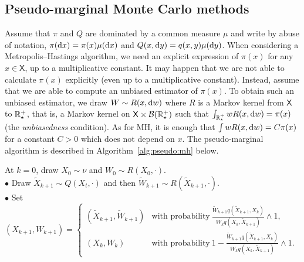 \documentclass[english,graybox,envcountchap,envcountsame,sectrefs,shortlabels]{svmono}
\theoremstyle{style}
\newcommand{\eqsp}{}
\newcommand{\Xset}{\mathsf{X}}
\begin{document}
\subsection{Pseudo-marginal Monte Carlo methods}
Assume that $\pi$ and $Q$ are dominated by a common measure $\mu$ and write by abuse of notation, $\pi(\mathrm{d} x)=\pi(x)\mu(\mathrm{d} x)$ and $Q(x,\mathrm{d} y)=q(x,y)\mu(\mathrm{d} y)$. When considering a Metropolis--Hastings algorithm, we need an explicit expression of $\pi(x)$ for any $x\in\Xset$, up to a multiplicative constant. It may happen that we are not able to calculate $\pi(x)$ explicitly (even up to a multiplicative constant). Instead, assume that we are able to compute an unbiased estimator of $\pi(x)$. To obtain such an unbiased estimator, we draw $W\sim R(x,\mathrm{d} w)$ where $R$ is a Markov kernel from $\Xset$ to $\mathbb{R}^+_\star$, that is, a Markov kernel on $\Xset\times {\mathcal B}(\rset^+_\star)$ such that $\int_{\mathbb{R}^+_\star} w R(x,\mathrm{d} w)=\pi(x)$ (the {\em unbiasedness} condition).  As for MH, it is enough that $\int w R(x,\mathrm{d} w) = C\pi(x)$ for a constant $C>0$ which does not depend on $x$. The pseudo-marginal algorithm \cite{beaumont2003estimation,andrieu2009pseudo} is described in Algorithm~\ref{alg:pseudo:mh} below.
\begin{algorithm}
\caption{\label{alg:pseudo:mh} The Pseudo-Marginal MH Algorithm}

{}
\BlankLine
At $k=0$, draw $X_{0}\sim \nu$ and $W_0\sim R(X_0,\cdot)$.\\
{
$\bullet$ Draw $\tilde X_{k+1}\sim Q(X_{t},\cdot)$ and then $ \tilde W_{k+1}\sim R(\tilde X_{k+1},\cdot)$.\\
$\bullet$ Set $(X_{k+1},W_{k+1})=\begin{cases} (\tilde X_{k+1},\tilde W_{k+1}) & \mbox{with probability}\ \frac{\tilde W_{k+1} q(\tilde X_{k+1},X_k)}{W_k q(X_k,\tilde X_{k+1})}\wedge 1\eqsp,\\ (X_{k},W_k)& \mbox{with probability}\ 1-\frac{\tilde W_{k+1} q(\tilde X_{k+1},X_k)}{W_k q(X_k,\tilde X_{k+1})}\wedge 1\eqsp.\end{cases}$
}
\end{algorithm}
\end{document}
